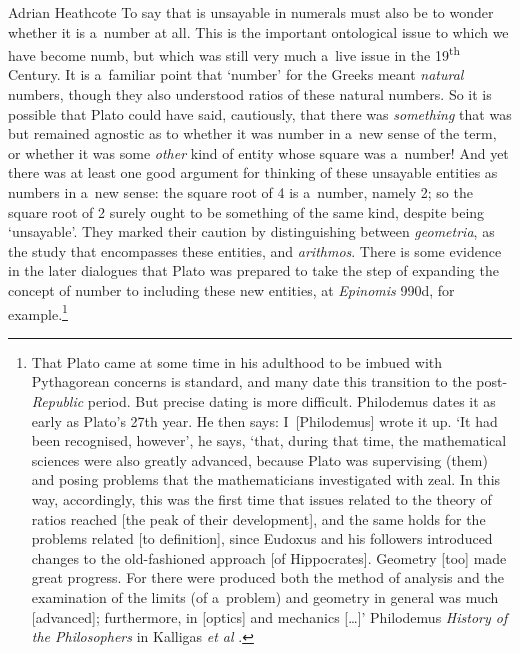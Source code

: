 \begin{artengenv}{Adrian Heathcote}
To say that \sqrtwo is unsayable in numerals must also be to wonder whether it is a~number at all. This is the important ontological issue to which we have become numb, but which was still very much a~live issue in the 19\textsuperscript{th} Century. It is a~familiar point that `number' for the Greeks meant \textit{natural} numbers, though they also understood ratios of these natural numbers. So it is possible that Plato could have said, cautiously, that there was \textit{something} that was \sqrtwo but remained agnostic as to whether it was number in a~new sense of the term, or whether it was some \textit{other} kind of entity whose square was a~number! And yet there was at least one good argument for thinking of these unsayable entities as numbers in a~new sense: the square root of 4 is a~number, namely 2; so the square root of 2 surely ought to be something of the same kind, despite being `unsayable'. They marked their caution by distinguishing between \textit{geometria}, as the study that encompasses these entities, and \textit{arithmos}. There is some evidence in the later dialogues that Plato was prepared to take the step of expanding the concept of number to including these new entities, at  \textit{Epinomis} 990d, for example.\footnote{That Plato came at some time in his adulthood to be imbued with Pythagorean concerns is standard, and many date this transition to the post-\textit{Republic} period. But precise dating is more difficult. Philodemus dates it as early as Plato's 27th year. He then says: I~[Philodemus] wrote it up. ‘It had been recognised, however’, he says, ‘that, during that time, the mathematical sciences were also greatly advanced, because Plato was supervising (them) and posing problems that the mathematicians investigated with zeal. In this way, accordingly, this was the first time that issues related to the theory of ratios reached [the peak of their development], and the same holds for the problems related [to definition], since Eudoxus and his followers introduced changes to the old-fashioned approach [of Hippocrates]. Geometry [too] made great progress. For there were produced both the method of analysis and the examination of the limits (of a~problem) and geometry in general was much [advanced]; furthermore, in [optics] and mechanics [\ldots]' Philodemus \textit{History of the Philosophers} in Kalligas \emph{et al} \parencite*{kalligas_platos_2020}.}


\end{artengenv}
